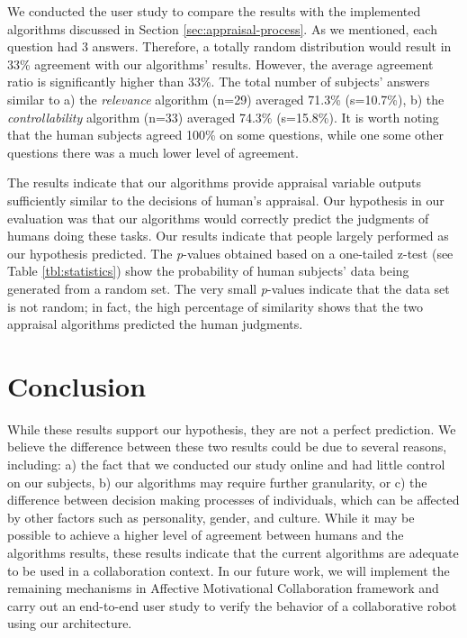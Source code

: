 \documentclass{article}
\begin{document}
We conducted the user study to compare the results with the implemented
algorithms discussed in Section \ref{sec:appraisal-process}. As we mentioned,
each question had 3 answers. Therefore, a totally random distribution would
result in 33\% agreement with our algorithms' results. However, the average
agreement ratio is significantly higher than 33\%. The total number of subjects'
answers similar to a) the \textit{relevance} algorithm (n=29) averaged 71.3\%
(s=10.7\%), b) the \textit{controllability} algorithm (n=33) averaged 74.3\%
(s=15.8\%). It is worth noting that the human subjects agreed 100\% on some
questions, while one some other questions there was a much lower level of
agreement.

The results indicate that our algorithms provide appraisal variable outputs
sufficiently similar to the decisions of human's appraisal. Our hypothesis in
our evaluation was that our algorithms would correctly predict the judgments of
humans doing these tasks. Our results indicate that people largely performed
as our hypothesis predicted. The \textit{p}-values obtained based on a
one-tailed z-test (see Table \ref{tbl:statistics}) show the probability of human
subjects' data being generated from a random set. The very small
\textit{p}-values indicate that the data set is not random; in fact, the high
percentage of similarity shows that the two appraisal algorithms predicted the
human judgments.

\vspace{-2mm}
\section{Conclusion}
\vspace{-1mm}
While these results support our hypothesis, they are not a perfect prediction.
We believe the difference between these two results could be due to several
reasons, including: a) the fact that we conducted our study online and had
little control on our subjects, b) our algorithms may require further
granularity, or c) the difference between decision making processes of
individuals, which can be affected by other factors such as personality, gender,
and culture. While it may be possible to achieve a higher level of agreement
between humans and the algorithms results, these results indicate that the
current algorithms are adequate to be used in a collaboration context. In our
future work, we will implement the remaining mechanisms in Affective
Motivational Collaboration framework and carry out an end-to-end user study to
verify the behavior of a collaborative robot using our architecture.
\end{document}
